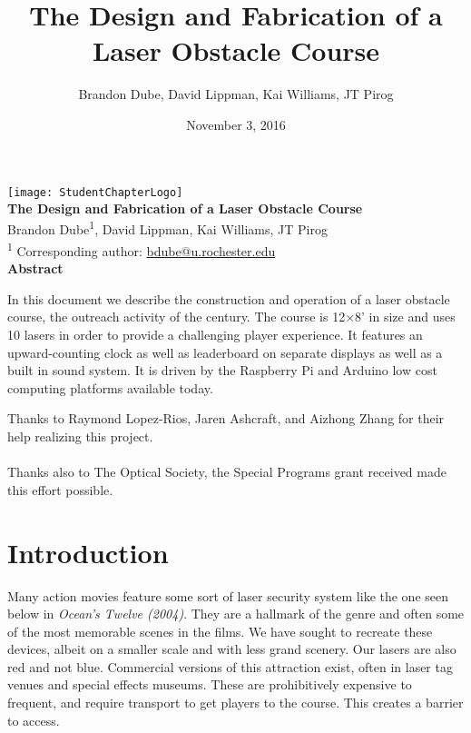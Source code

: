 \documentclass[11pt,oneside,final,letterpaper]{memoir}
\title{The Design and Fabrication of a Laser Obstacle Course}
\author{Brandon Dube, David Lippman, Kai Williams, JT Pirog}
\date{November 3, 2016}
\begin{document}
\begin{titlingpage}
\begin{center}
    \texttt{[image: StudentChapterLogo]} \\
    \vspace*{10pt}
    \textsf{
        \textbf{%
            \Huge{%
                \textcolor{OSABlue}{%
                    The Design and Fabrication of a Laser Obstacle Course
                }
            }
        } \\
        \vspace*{12pt}
        \large{Brandon Dube\textsuperscript{1}, David Lippman, Kai Williams, JT Pirog \\}
        \small{\textsuperscript{1}\hspace*{-0.25em} Corresponding author: \href{mailto:bdube@u.rochester.edu}{bdube@u.rochester.edu}} \\
        \vspace*{24pt}
        \Large\textbf{\textcolor{OSABlue}{Abstract}} \\
    }
\end{center}

\noindent In this document we describe the construction and operation of a laser obstacle course, the outreach activity of the century.  The course is 12$\times{}$8' in size and uses 10 lasers in order to provide a challenging player experience.  It features an upward-counting clock as well as leaderboard on separate displays as well as a built in sound system.  It is driven by the Raspberry Pi and Arduino low cost computing platforms available today.

\vspace*{\fill}
\noindent\small{%
Thanks to Raymond Lopez-Rios, Jaren Ashcraft, and Aizhong Zhang for their help realizing this project.\\ \\
Thanks also to The Optical Society, the Special Programs grant received made this effort possible.
}
\end{titlingpage}

\chapter*{Introduction}
   
Many action movies feature some sort of laser security system like the one seen below in \textit{Ocean's Twelve (2004)}.  They are a hallmark of the genre and often some of the most memorable scenes in the films.  We have sought to recreate these devices, albeit on a smaller scale and with less grand scenery.  Our lasers are also red and not blue.  Commercial versions of this attraction exist, often in laser tag venues and special effects museums.  These are prohibitively expensive to frequent, and require transport to get players to the course.  This creates a barrier to access.
\end{document}
